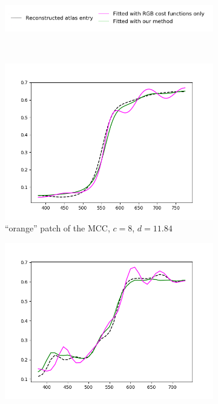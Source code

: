 \begin{figure}[t]
	\centering
	\captionsetup[subfigure]{font=footnotesize,labelfont=footnotesize}
	\captionsetup[subfigure]{justification=centering}
	\begin{subfigure}[t]{0.70\textwidth}
		\includegraphics[width=\linewidth]{img/results_costFunctions_legend.png}
	\end{subfigure} \\
	\begin{subfigure}[t]{0.45\textwidth}
		\includegraphics[width=\linewidth]{img/results_costFunctions_orange.png}
		\caption{``orange'' patch of the MCC, $c = 8$, $d = 11.84$}
		\label{fig:resultsCostFunctions_orange}
	\end{subfigure} \hspace{0.1em}
	\begin{subfigure}[t]{0.45\textwidth}
		\includegraphics[width=\linewidth]{img/results_costFunctions_mcb0706.png}

\end{subfigure}
\end{figure}
